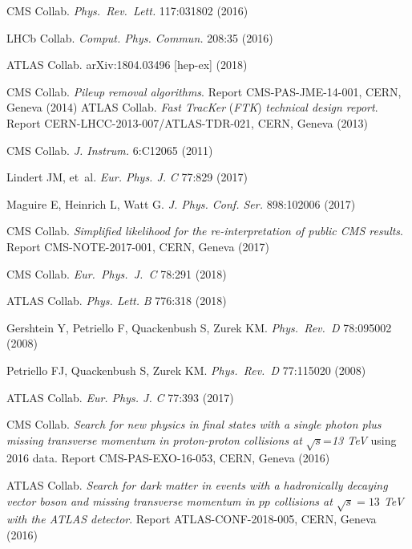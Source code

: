 \documentclass{ar-1col}
\begin{document}
\begin{thebibliography}{175}
 CMS Collab.  \textit{Phys.\ Rev.\ Lett.}  {117}:031802 (2016)

{LHCb Collab}. \textit{Comput. Phys. Commun.} 208:35 (2016)

{ATLAS Collab}. arXiv:1804.03496 [hep-ex] (2018)

CMS Collab. \textit{Pileup removal algorithms}. Report CMS-PAS-JME-14-001, CERN, Geneva (2014)
%
ATLAS Collab. \textit{Fast TracKer} (\textit{FTK}) \textit{technical design report}. Report CERN-LHCC-2013-007/ATLAS-TDR-021, CERN, Geneva
(2013)

{CMS Collab}. \textit{J. Instrum.} 6:C12065 (2011)

Lindert JM, et~al. \textit{Eur. Phys. J.} \textit{C} 77:829 (2017)

Maguire E, Heinrich L, Watt G. \textit{J. Phys. Conf. Ser.}
898:102006 (2017)

CMS Collab. \textit{Simplified likelihood for the re-interpretation of public CMS results}. Report CMS-NOTE-2017-001, CERN, Geneva (2017)

{CMS Collab.} \textit{Eur.\ Phys.\ J.\ C} {78}:291 (2018)

{ATLAS Collab.} \textit{Phys. Lett.} \textit{B} 776:318 (2018)

Gershtein Y, Petriello F, Quackenbush S, Zurek KM. \textit{Phys.\ Rev.\ D }{78}:095002 (2008)

Petriello FJ, Quackenbush S, Zurek KM. \textit{Phys.\ Rev.\ D} {77}:115020 (2008)
  
{ATLAS Collab.} \textit{Eur. Phys. J.} \textit{C} 77:393 (2017)

CMS Collab. \textit{Search for new physics in final states with a single photon plus missing transverse momentum in proton-proton collisions at} $\sqrt{s}$=\textit{13 TeV} using 2016 data. Report CMS-PAS-EXO-16-053, CERN, Geneva (2016)

ATLAS Collab. \textit{Search for dark matter in events with a hadronically
                       decaying vector boson and missing transverse momentum in
                       $pp$ collisions at $\sqrt{s} = 13$ TeV with the ATLAS
                       detector}. Report ATLAS-CONF-2018-005, CERN, Geneva (2016)


\end{thebibliography}
\end{document}
